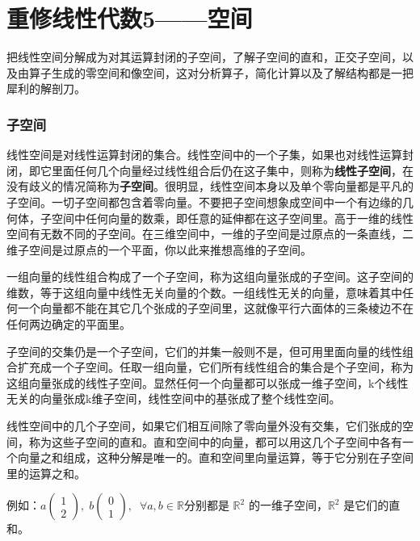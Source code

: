 	\chapter{重修线性代数5——空间}
	把线性空间分解成为对其运算封闭的子空间，了解子空间的直和，正交子空间，以及由算子生成的零空间和像空间，这对分析算子，简化计算以及了解结构都是一把犀利的解剖刀。
	
\subsection{子空间}
	
	线性空间是对线性运算封闭的集合。线性空间中的一个子集，如果也对线性运算封闭，即它里面任何几个向量经过线性组合后仍在这子集中，则称为\textbf{线性子空间}，在没有歧义的情况简称为\textbf{子空间}。很明显，线性空间本身以及单个零向量都是平凡的子空间。一切子空间都包含着零向量。不要把子空间想象成空间中一个有边缘的几何体，子空间中任何向量的数乘，即任意的延伸都在这子空间里。高于一维的线性空间有无数不同的子空间。在三维空间中，一维的子空间是过原点的一条直线，二维子空间是过原点的一个平面，你以此来推想高维的子空间。
	
	一组向量的线性组合构成了一个子空间，称为这组向量张成的子空间。这子空间的维数，等于这组向量中线性无关向量的个数。一组线性无关的向量，意味着其中任何一个向量都不能在其它几个张成的子空间里，这就像平行六面体的三条棱边不在任何两边确定的平面里。
	
	子空间的交集仍是一个子空间，它们的并集一般则不是，但可用里面向量的线性组合扩充成一个子空间。任取一组向量，它们所有线性组合的集合是个子空间，称为这组向量张成的线性子空间。显然任何一个向量都可以张成一维子空间，k个线性无关的向量张成k维子空间，线性空间中的基张成了整个线性空间。
	
	线性空间中的几个子空间，如果它们相互间除了零向量外没有交集，它们张成的空间，称为这些子空间的直和。直和空间中的向量，都可以用这几个子空间中各有一个向量之和组成，这种分解是唯一的。直和空间里向量运算，等于它分别在子空间里的运算之和。
	
	\kaishu
	
	例如：$ a\begin{pmatrix}1\\2\end{pmatrix},\; b\begin{pmatrix}0\\ 1\end{pmatrix}, \;\; \forall  a,b \in \mathbb{R} $分别都是 $ \mathbb{R}^2 $ 的一维子空间，$ \mathbb{R}^2 $ 是它们的直和。
	
	\songti
	
